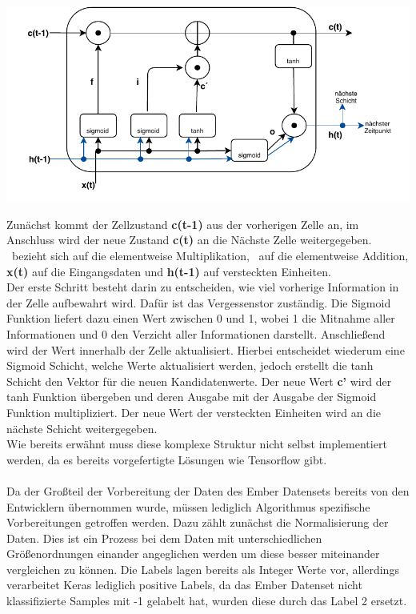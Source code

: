 \documentclass[
    12pt, %
    DIV10,
    ngerman, %
    a4paper, %
    oneside, %
    titlepage, %
    parskip=half, %
    headings=normal, %
    listof=totoc, %
    bibliography=totoc, %
    index=totoc, %
    captions=tableheading, %
    final %
]{scrreprt}
\begin{document}
\begin{center}
\includegraphics[scale=0.9]{img/lstm.pdf}
\label{fig:lstm}
\end{center}
Zunächst kommt der Zellzustand \textbf{c(t-1)} aus der vorherigen Zelle an, im Anschluss wird der neue Zustand \textbf{c(t)} an die Nächste Zelle weitergegeben. \odot \ bezieht sich auf die elementweise Multiplikation, \oplus \ auf die elementweise Addition, \textbf{x(t)} auf die Eingangsdaten und \textbf{h(t-1)} auf versteckten Einheiten.\\
Der erste Schritt besteht darin zu entscheiden, wie viel vorherige Information in der Zelle aufbewahrt wird. Dafür ist das Vergessenstor zuständig. Die Sigmoid Funktion liefert dazu einen Wert zwischen 0 und 1, wobei 1 die Mitnahme aller Informationen und 0 den Verzicht aller Informationen darstellt. Anschlie{\ss}end wird der Wert innerhalb der Zelle aktualisiert. Hierbei entscheidet wiederum eine Sigmoid Schicht, welche Werte aktualisiert werden, jedoch erstellt die tanh Schicht den Vektor für die neuen Kandidatenwerte. Der neue Wert \textbf{c'}  wird der tanh Funktion übergeben und deren Ausgabe mit der Ausgabe der Sigmoid Funktion multipliziert. Der neue Wert der versteckten Einheiten wird an die nächste Schicht weitergegeben.\\
Wie bereits erwähnt muss diese komplexe Struktur nicht selbst implementiert werden, da es bereits vorgefertigte Lösungen wie Tensorflow gibt.
\\\\
Da der Gro{\ss}teil der Vorbereitung der Daten des Ember Datensets bereits von den Entwicklern übernommen wurde, müssen lediglich  Algorithmus spezifische Vorbereitungen getroffen werden. Dazu zählt zunächst die Normalisierung der Daten. Dies ist ein Prozess bei dem Daten mit unterschiedlichen Grö{\ss}enordnungen einander angeglichen werden um diese besser miteinander vergleichen zu können. Die Labels lagen bereits als Integer Werte vor, allerdings verarbeitet Keras lediglich positive Labels, da das Ember Datenset nicht klassifizierte Samples mit -1 gelabelt hat, wurden diese durch das Label 2 ersetzt. \\
\end{document}
